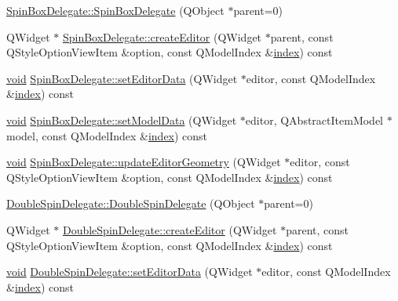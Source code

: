 \begin{DoxyCompactItemize}
\item 
\hyperlink{group___config_plugin_gabf1b830266511d0237c97b46f49e01f9}{Spin\-Box\-Delegate\-::\-Spin\-Box\-Delegate} (Q\-Object $\ast$parent=0)
\item 
Q\-Widget $\ast$ \hyperlink{group___config_plugin_ga4fc1b4a209668b60b0834bdb1d36e1c0}{Spin\-Box\-Delegate\-::create\-Editor} (Q\-Widget $\ast$parent, const Q\-Style\-Option\-View\-Item \&option, const Q\-Model\-Index \&\hyperlink{glext_8h_ab47dd9958bcadea08866b42bf358e95e}{index}) const 
\item 
\hyperlink{group___u_a_v_objects_plugin_ga444cf2ff3f0ecbe028adce838d373f5c}{void} \hyperlink{group___config_plugin_gacbac1fc1091ef04b08ca9683a1d6f0ee}{Spin\-Box\-Delegate\-::set\-Editor\-Data} (Q\-Widget $\ast$editor, const Q\-Model\-Index \&\hyperlink{glext_8h_ab47dd9958bcadea08866b42bf358e95e}{index}) const 
\item 
\hyperlink{group___u_a_v_objects_plugin_ga444cf2ff3f0ecbe028adce838d373f5c}{void} \hyperlink{group___config_plugin_ga3698304b3741f548b0b4755c1782d291}{Spin\-Box\-Delegate\-::set\-Model\-Data} (Q\-Widget $\ast$editor, Q\-Abstract\-Item\-Model $\ast$model, const Q\-Model\-Index \&\hyperlink{glext_8h_ab47dd9958bcadea08866b42bf358e95e}{index}) const 
\item 
\hyperlink{group___u_a_v_objects_plugin_ga444cf2ff3f0ecbe028adce838d373f5c}{void} \hyperlink{group___config_plugin_ga3a90cff710ddd79a11b31054f9c963fb}{Spin\-Box\-Delegate\-::update\-Editor\-Geometry} (Q\-Widget $\ast$editor, const Q\-Style\-Option\-View\-Item \&option, const Q\-Model\-Index \&\hyperlink{glext_8h_ab47dd9958bcadea08866b42bf358e95e}{index}) const 
\item 
\hyperlink{group___config_plugin_ga53d62f046bdee3e5b67f2b82aaa08a8a}{Double\-Spin\-Delegate\-::\-Double\-Spin\-Delegate} (Q\-Object $\ast$parent=0)
\item 
Q\-Widget $\ast$ \hyperlink{group___config_plugin_ga33340622f34643415ef4fc706e9a6350}{Double\-Spin\-Delegate\-::create\-Editor} (Q\-Widget $\ast$parent, const Q\-Style\-Option\-View\-Item \&option, const Q\-Model\-Index \&\hyperlink{glext_8h_ab47dd9958bcadea08866b42bf358e95e}{index}) const 
\item 
\hyperlink{group___u_a_v_objects_plugin_ga444cf2ff3f0ecbe028adce838d373f5c}{void} \hyperlink{group___config_plugin_ga7016b6a15b52b4f03fe882a1ceac795a}{Double\-Spin\-Delegate\-::set\-Editor\-Data} (Q\-Widget $\ast$editor, const Q\-Model\-Index \&\hyperlink{glext_8h_ab47dd9958bcadea08866b42bf358e95e}{index}) const 
\item 

\end{DoxyCompactItemize}
